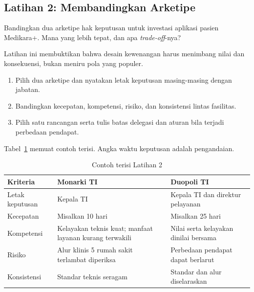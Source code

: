 \subsection*{Latihan 2: Membandingkan Arketipe}

Bandingkan dua arketipe hak keputusan untuk investasi aplikasi pasien Medikara+. Mana yang lebih tepat, dan
apa \textit{trade-off}-nya?

Latihan ini membuktikan bahwa desain kewenangan harus menimbang nilai dan konsekuensi, bukan meniru pola
yang populer.
\begin{enumerate}
  \item Pilih dua arketipe dan nyatakan letak keputusan masing-masing dengan jabatan.
  \item Bandingkan kecepatan, kompetensi, risiko, dan konsistensi lintas fasilitas.
  \item Pilih satu rancangan serta tulis batas delegasi dan aturan bila terjadi perbedaan pendapat.
\end{enumerate}

Tabel~\ref{tab:ch02-lat2-contoh} memuat contoh terisi. Angka waktu keputusan adalah pengandaian.
\begin{table}[!htb]
  \centering\small
  \caption{Contoh terisi Latihan 2}\label{tab:ch02-lat2-contoh}
  \begin{tabularx}{\textwidth}{|>{\raggedright\arraybackslash}p{}|>{\raggedright\arraybackslash}X|>{\raggedright\arraybackslash}X|}
    \hline
    \textbf{Kriteria} & \textbf{Monarki TI} & \textbf{Duopoli TI} \\ \hline
    Letak keputusan & Kepala TI & Kepala TI dan direktur pelayanan \\ \hline
    Kecepatan & Misalkan 10 hari & Misalkan 25 hari \\ \hline
    Kompetensi & Kelayakan teknis kuat; manfaat layanan kurang terwakili & Nilai serta kelayakan dinilai
    bersama \\ \hline
    Risiko & Alur klinis 5 rumah sakit terlambat diperiksa & Perbedaan pendapat dapat berlarut \\ \hline
    Konsistensi & Standar teknis seragam & Standar dan alur diselaraskan \\ \hline
  \end{tabularx}
\end{table}

